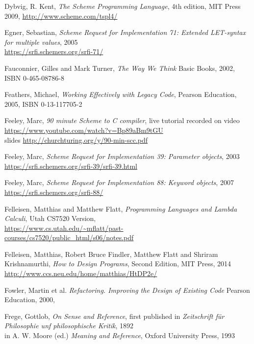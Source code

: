 \begin{thebibliography}{90}
  Dybvig, R. Kent,
  \emph{The Scheme Programming Language},
  4th edition, MIT Press 2009, \url{http://www.scheme.com/tspl4/}


  Egner, Sebastian, \emph{Scheme Request for Implementation 71:
    Extended LET-syntax for multiple values}, 2005 \\
  \url{https://srfi.schemers.org/srfi-71/}
  
  Fauconnier, Gilles and Mark Turner,
  \emph{The Way We Think}
  Basic Books, 2002, ISBN 0-465-08786-8

  Feathers, Michael,
  \emph{Working Effectively with Legacy Code}, Pearson Education, 2005,
  ISBN 0-13-117705-2

  Feeley, Marc,
  \emph{90 minute Scheme to C compiler},
  live tutorial recorded on video \\
  \url{https://www.youtube.com/watch?v=Bp89aBm9tGU} \\
  slides \url{http://churchturing.org/y/90-min-scc.pdf}

  Feeley, Marc,
  \emph{Scheme Request for Implementation 39: Parameter objects}, 2003 \\
  \url{https://srfi.schemers.org/srfi-39/srfi-39.html}
  
  Feeley, Marc,
  \emph{Scheme Request for Implementation 88: Keyword objects}, 2007 \\
  \url{https://srfi.schemers.org/srfi-88/}
  
  Felleisen, Matthias and Matthew Flatt,
  \emph{Programming Languages and Lambda Calculi}, Utah CS7520 Version, \\
  \url{https://www.cs.utah.edu/~mflatt/past-courses/cs7520/public_html/s06/notes.pdf}

  Felleisen, Matthias, Robert Bruce Findler, Matthew Flatt
  and Shriram Krishnamurthi,
  \emph{How to Design Programs},
  Second Edition, MIT Press, 2014 \\
  \url{http://www.ccs.neu.edu/home/matthias/HtDP2e/}
  
  Fowler, Martin et al.
  \emph{Refactoring. Improving the Design of Existing Code}
  Pearson Education, 2000,

  Frege, Gottlob,
  \emph{On Sense and Reference},
  first published in
  \emph{Zeitschrift für  Philosophie unf philosophische Kritik},
  1892 \\
  in A. W. Moore (ed.) \emph{Meaning and Reference},
  Oxford University Press, 1993


\end{thebibliography}
